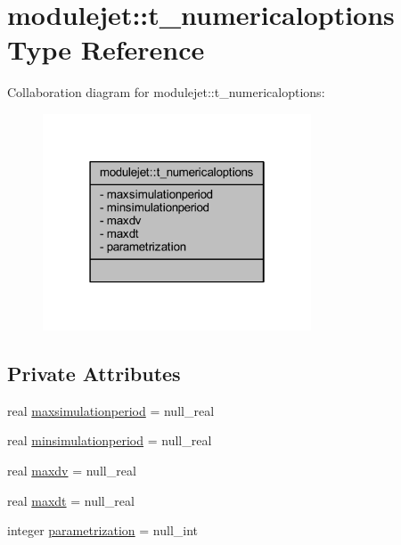 \hypertarget{structmodulejet_1_1t__numericaloptions}{}\section{modulejet\+:\+:t\+\_\+numericaloptions Type Reference}
\label{structmodulejet_1_1t__numericaloptions}


Collaboration diagram for modulejet\+:\+:t\+\_\+numericaloptions\+:\nopagebreak
\begin{figure}[H]
\begin{center}
\leavevmode
\includegraphics[width=226pt]{structmodulejet_1_1t__numericaloptions__coll__graph}
\end{center}
\end{figure}
\subsection*{Private Attributes}
\begin{DoxyCompactItemize}
\item 
real \mbox{\hyperlink{structmodulejet_1_1t__numericaloptions_a9753dea35a7e2bc77cf7a7f2cb7fd08a}{maxsimulationperiod}} = null\+\_\+real
\item 
real \mbox{\hyperlink{structmodulejet_1_1t__numericaloptions_aa5a1392f312e4d0a16f70f8f4473e898}{minsimulationperiod}} = null\+\_\+real
\item 
real \mbox{\hyperlink{structmodulejet_1_1t__numericaloptions_a726402818fbc0ffc6a1092feafdbebb2}{maxdv}} = null\+\_\+real
\item 
real \mbox{\hyperlink{structmodulejet_1_1t__numericaloptions_ae248149bfe0ffc8ea1c4b293c13eccb1}{maxdt}} = null\+\_\+real
\item 
integer \mbox{\hyperlink{structmodulejet_1_1t__numericaloptions_a77856ef742bdcf8b929dbb882876c7a3}{parametrization}} = null\+\_\+int
\end{DoxyCompactItemize}


